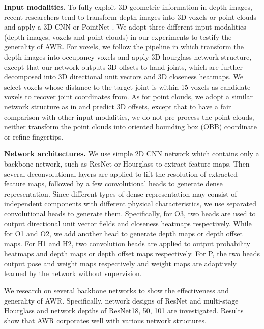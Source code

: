 \documentclass[letterpaper]{article} \usepackage{aaai20}  \usepackage{times}  \usepackage{helvet} \usepackage{courier}  \usepackage[hyphens]{url}  \usepackage{graphicx} \usepackage{amsmath}
\begin{document}
\parskip=0pt

\textbf{Input modalities.} To fully exploit 3D geometric information in depth images, recent researchers tend to transform depth images into 3D voxels \cite{v2v} or point clouds \cite{handpointnet,p2p} and apply a 3D CNN or PointNet \cite{pointnet}. We adopt three different input modalities (depth images, voxels and point clouds) in our experiments to testify the generality of AWR. For voxels, we follow the pipeline in \cite{v2v} which transform the depth images into occupancy voxels and apply 3D hourglass network structure, except that our network outputs 3D offsets to hand joints, which are further decomposed into 3D directional unit vectors and 3D closeness heatmaps. We select voxels whose distance to the target joint is within 15 voxels as candidate voxels to recover joint coordinates from. As for point clouds, we adopt a similar network structure as in \cite{p2p} and predict 3D offsets, except that to have a fair comparison with other input modalities, we do not pre-process the point clouds, neither transform the point clouds into oriented bounding box (OBB) coordinate or refine fingertips. 

\parskip=0pt

\textbf{Network architectures.} We use simple 2D CNN network which contains only a backbone network, such as ResNet\cite{resnet} or Hourglass\cite{hourglass} to extract feature maps. Then several deconvolutional layers are applied to lift the resolution of extracted feature maps, followed by a few convolutional heads to generate dense representation. Since different types of dense representation may consist of independent components with different physical characteristics, we use separated convolutional heads to generate them. Specifically, for O3, two heads are used to output directional unit vector fields and closeness heatmaps respectively. While for O1 and O2, we add another head to generate depth maps or depth offset maps. For H1 and H2, two convolution heads are applied to output probability heatmaps and depth maps or depth offset maps respectively. For P, the two heads output pose and weight maps respectively and weight maps are adaptively learned by the network without supervision.

We research on several backbone networks to show the effectiveness and generality of AWR. Specifically, network designs of ResNet \cite{resnet} and multi-stage Hourglass \cite{hourglass} and network depths of ResNet18, 50, 101 are investigated. Results show that AWR corporates well with various network structures.
\end{document}
